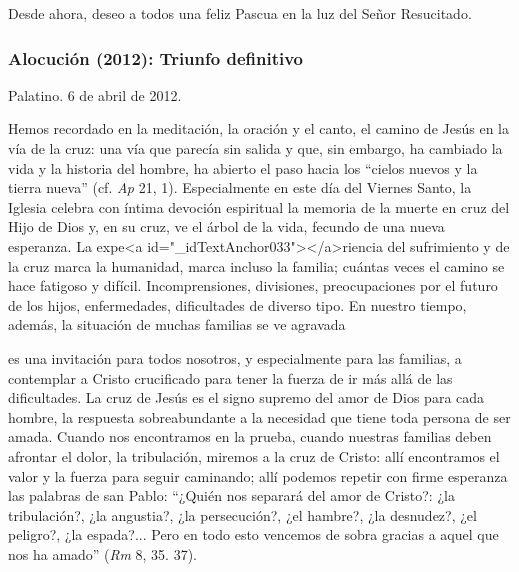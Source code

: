 			\begin{body}Desde ahora, deseo a todos una feliz Pascua en la luz del Señor Resucitado.\end{body}
			
			\subsubsection{Alocución (2012): Triunfo definitivo}
			
			\begin{referencia}Palatino. 6 de abril de 2012. \end{referencia}
			
			\begin{body}Hemos recordado en la meditación, la oración y el canto, el camino de Jesús en la vía de la cruz: una vía que parecía sin salida y que, sin embargo, ha cambiado la vida y la historia del hombre, ha abierto el paso hacia los “cielos nuevos y la tierra nueva” (cf.\textit{ Ap} 21, 1). Especialmente en este día del Viernes Santo, la Iglesia celebra con íntima devoción espiritual la memoria de la muerte en cruz del Hijo de Dios y, en su cruz, ve el árbol de la vida, fecundo de una nueva esperanza. La expe<a id="_idTextAnchor033"></a>riencia del sufrimiento y de la cruz marca la humanidad, marca incluso la familia; cuántas veces el camino se hace fatigoso y difícil. Incomprensiones, divisiones, preocupaciones por el futuro de los hijos, enfermedades, dificultades de diverso tipo. En nuestro tiempo, además, la situación de muchas familias se ve agravada \begin{bodysmall}\end{bodysmall} es una invitación para todos nosotros, y especialmente para las familias, a contemplar a Cristo crucificado para tener la fuerza de ir más allá de las dificultades. La cruz de Jesús es el signo supremo del amor de Dios para cada hombre, la respuesta sobreabundante a la necesidad que tiene toda persona de ser amada. Cuando nos encontramos en la prueba, cuando nuestras familias deben afrontar el dolor, la tribulación, miremos a la cruz de Cristo: allí encontramos el valor y la fuerza para seguir caminando; allí podemos repetir con firme esperanza las palabras de san Pablo: “¿Quién nos separará del amor de Cristo?: ¿la tribulación?, ¿la angustia?, ¿la persecución?, ¿el hambre?, ¿la desnudez?, ¿el peligro?, ¿la espada?... Pero en todo esto vencemos de sobra gracias a aquel que nos ha amado” (\textit{Rm} 8, 35. 37).\end{body}
			
